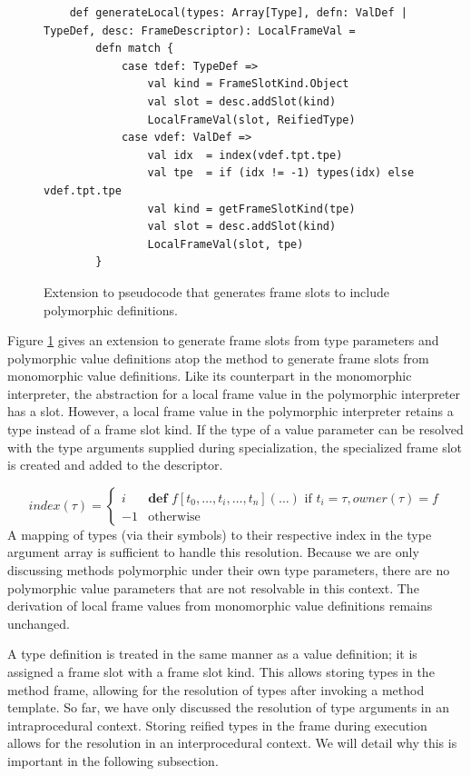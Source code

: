 \begin{figure}[!htb]
	\begin{verbatim}
	def generateLocal(types: Array[Type], defn: ValDef | TypeDef, desc: FrameDescriptor): LocalFrameVal = 
		defn match {
			case tdef: TypeDef => 
				val kind = FrameSlotKind.Object
				val slot = desc.addSlot(kind)
				LocalFrameVal(slot, ReifiedType)
			case vdef: ValDef => 
				val idx  = index(vdef.tpt.tpe)
				val tpe  = if (idx != -1) types(idx) else vdef.tpt.tpe
				val kind = getFrameSlotKind(tpe)
				val slot = desc.addSlot(kind)
				LocalFrameVal(slot, tpe)
		}
	\end{verbatim}
	\caption{Extension to pseudocode that generates frame slots to include polymorphic definitions.}
	\label{impl:gen-poly-locals}
\end{figure}

Figure \ref{impl:gen-poly-locals} gives an extension to generate frame slots from type parameters and polymorphic value definitions atop the method to generate frame slots from monomorphic value definitions.
Like its counterpart in the monomorphic interpreter, the abstraction for a local frame value in the polymorphic interpreter has a slot.
However, a local frame value in the polymorphic interpreter retains a type instead of a frame slot kind.
If the type of a value parameter can be resolved with the type arguments supplied during specialization, the specialized frame slot is created and added to the descriptor.

$$
index(\tau) = 
\begin{cases}
	i  & \textbf{def } f[t_0, \ldots, t_i, \ldots, t_n](\ldots) \text{ if } t_i = \tau, owner(\tau)=f \\
	-1 & \text{otherwise}
\end{cases}
$$
A mapping of types (via their symbols) to their respective index in the type argument array is sufficient to handle this resolution.
Because we are only discussing methods polymorphic under their own type parameters, there are no polymorphic value parameters that are not resolvable in this context.
The derivation of local frame values from monomorphic value definitions remains unchanged. 

A type definition is treated in the same manner as a value definition; it is assigned a frame slot with a  frame slot kind.
This allows storing types in the method frame, allowing for the resolution of types after invoking a method template.
So far, we have only discussed the resolution of type arguments in an intraprocedural context.
Storing reified types in the frame during execution allows for the resolution in an interprocedural context.
We will detail why this is important in the following subsection.

